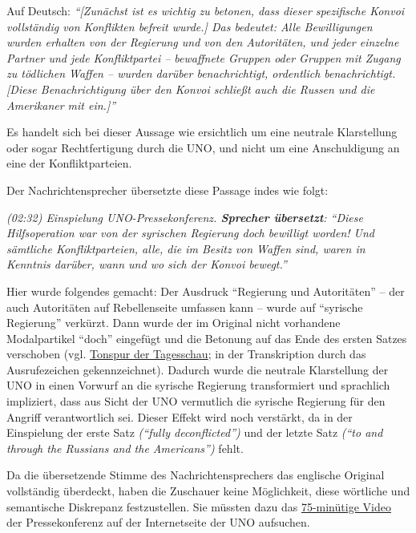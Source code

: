 Auf Deutsch: \emph{``{[}Zunächst ist es wichtig zu betonen, dass dieser
spezifische Konvoi vollständig von Konflikten befreit wurde.{]} Das
bedeutet: Alle Bewilligungen wurden erhalten von der Regierung und von
den Autoritäten, und jeder einzelne Partner und jede Konfliktpartei --
bewaffnete Gruppen oder Gruppen mit Zugang zu tödlichen Waffen -- wurden
darüber benachrichtigt, ordentlich benachrichtigt. {[}Diese
Benachrichtigung über den Konvoi schließt auch die Russen und die
Amerikaner mit ein.{]}''}

Es handelt sich bei dieser Aussage wie ersichtlich um eine neutrale
Klarstellung oder sogar Rechtfertigung durch die UNO, und nicht um eine
Anschuldigung an eine der Konfliktparteien.

Der Nachrichtensprecher übersetzte diese Passage indes wie folgt:

\emph{(02:32) Einspielung UNO-Pressekonferenz. \textbf{Sprecher
übersetzt}: ``Diese Hilfsoperation war von der syrischen Regierung doch
bewilligt worden! Und sämtliche Konfliktparteien, alle, die im Besitz
von Waffen sind, waren in Kenntnis darüber, wann und wo sich der Konvoi
bewegt.''}

Hier wurde folgendes gemacht: Der Ausdruck ``Regierung und Autoritäten''
-- der auch Autoritäten auf Rebellenseite umfassen kann -- wurde auf
``syrische Regierung'' verkürzt. Dann wurde der im Original nicht
vorhandene Modalpartikel ``doch'' eingefügt und die Betonung auf das
Ende des ersten Satzes verschoben (vgl.
\href{http://www.srf.ch/play/tv/tagesschau/video/tagesschau-vom-20-09-2016-1930?id=d6397078-c449-4f65-8cf6-599e1b16c2ef}{Tonspur
der Tagesschau}; in der Transkription durch das Ausrufezeichen
gekenn­zeichnet). Dadurch wurde die neutrale Klarstellung der UNO in
einen Vorwurf an die syrische Regierung transformiert und sprachlich
impliziert, dass aus Sicht der UNO vermutlich die syrische Regierung für
den Angriff verantwortlich sei. Dieser Effekt wird noch verstärkt, da in
der Einspielung der erste Satz \emph{(``fully deconflicted'')} und der
letzte Satz \emph{(``to and through the Russians and the Americans'')}
fehlt.

Da die übersetzende Stimme des Nachrichtensprechers das englische
Original vollständig überdeckt, haben die Zuschauer keine Möglichkeit,
diese wörtliche und semantische Diskrepanz festzustellen. Sie müssten
dazu das
\href{http://webtv.un.org/media/geneva-press-briefings/watch/geneva-press-briefing-hrc-ifrc-ocha-who-iom-unhcr-ohchr-ilo-gavi/5131061146001}{75-minütige
Video} der Pressekonferenz auf der Internetseite der UNO aufsuchen.

